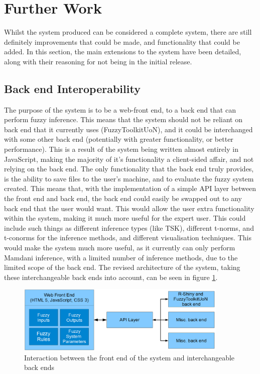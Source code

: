 \section{Further Work}
Whilst the system produced can be considered a complete system, there are still definitely improvements that could be made, and functionality that could be added. In this section, the main extensions to the system have been detailed, along with their reasoning for not being in the initial release. 

\subsection{Back end Interoperability}
The purpose of the system is to be a web-front end, to a back end that can perform fuzzy inference. This means that the system should not be reliant on back end that it currently uses (FuzzyToolkitUoN), and it could be interchanged with some other back end (potentially with greater functionality, or better performance). This is a result of the system being written almost entirely in JavaScript, making the majority of it's functionality a client-sided affair, and not relying on the back end. The only functionality that the back end truly provides, is the ability to save files to the user's machine, and to evaluate the fuzzy system created. This means that, with the implementation of a simple API layer between the front end and back end, the back end could easily be swapped out to any back end that the user would want. This would allow the user extra functionality within the system, making it much more useful for the expert user. This could include such things as different inference types (like TSK), different t-norms, and t-conorms for the inference methods, and different visualisation techniques. This would make the system much more useful, as it currently can only perform Mamdani inference, with a limited number of inference methods, due to the limited scope of the back end. The revised architecture of the system, taking these interchangeable back ends into account, can be seen in figure \ref{fig:fw-interop}.

\begin{figure}[ht!]
	\begin{center}
		\includegraphics[width=0.9\textwidth]{images/archi-new}
	\end{center}
	\vspace{-2mm}
	\caption{Interaction between the front end of the system and interchangeable back ends}
	\label{fig:fw-interop}
	\vspace{-1mm}
\end{figure}

